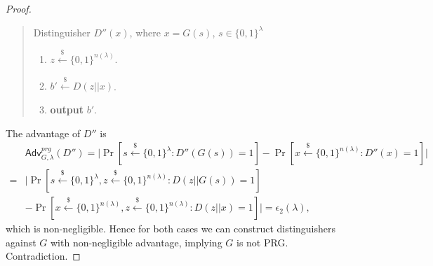 \documentclass[12pt]{article}
\newcommand{\eqdef}{\stackrel{def}{=}}
\newcommand{\bits}{\{0,1\}}
\newcommand{\getsr}{\stackrel{\$}{\gets}}
\newcommand{\Adv}{\textsf{Adv}}
\theoremstyle{definition}
\begin{document}
\begin{proof}
\begin{quote}
Distinguisher $D'' (x)$, where $x=G(s)$, $s\in\bits^\lambda$
\begin{enumerate}
\item $z\getsr\bits^{n(\lambda)}$.
\item $b' \getsr D(z||x)$.
\item {\bf output} $b'$.
\end{enumerate}
\end{quote}
The advantage of $D''$ is
$$
\begin{aligned}
& \Adv_{G,\lambda}^{prg}(D'') 
= \bigg| \Pr[s\getsr\bits^\lambda : D''(G(s))=1] - \Pr[x\getsr\bits^{n(\lambda)}: D''(x)=1] \bigg| \\
=& \bigg| \Pr[s\getsr\bits^\lambda, z\getsr\bits^{n(\lambda)} : D(z||G(s))=1]\\
& - \Pr[x\getsr\bits^{n(\lambda)}, z\getsr\bits^{n(\lambda)}: D(z||x)=1] \bigg| 
= \epsilon_2(\lambda),
\end{aligned}
$$
which is non-negligible.
Hence for both cases we can construct distinguishers against $G$ with non-negligible advantage, implying $G$ is not PRG. Contradiction. 


\end{proof}
\end{document}

